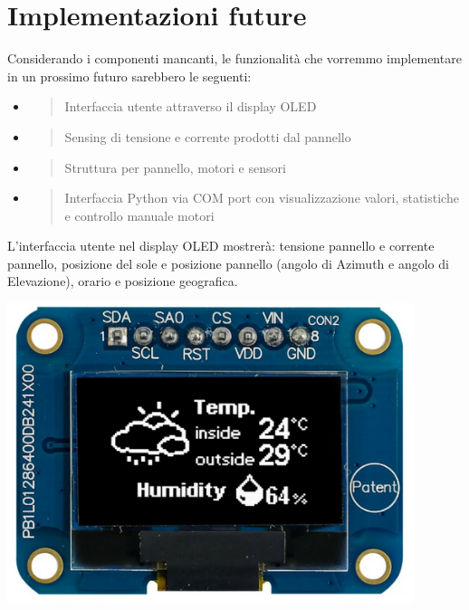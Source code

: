 \chapter{Implementazioni future}

Considerando i componenti mancanti, le funzionalità che vorremmo
implementare in un prossimo futuro sarebbero le seguenti:

\begin{itemize}
\item
  \begin{quote}
  Interfaccia utente attraverso il display OLED
  \end{quote}
\item
  \begin{quote}
  Sensing di tensione e corrente prodotti dal pannello
  \end{quote}
\item
  \begin{quote}
  Struttura per pannello, motori e sensori
  \end{quote}
\item
  \begin{quote}
  Interfaccia Python via COM port con visualizzazione valori,
  statistiche e controllo manuale motori
  \end{quote}
\end{itemize}

L'interfaccia utente nel display OLED mostrerà: tensione pannello e
corrente pannello, posizione del sole e posizione pannello (angolo di
Azimuth e angolo di Elevazione), orario e posizione geografica.

\begin{center}
\includegraphics[width=4.68229in,height=3.4426in]{figures/image27.png}
\captionsetup{type=figure}
\end{center}


